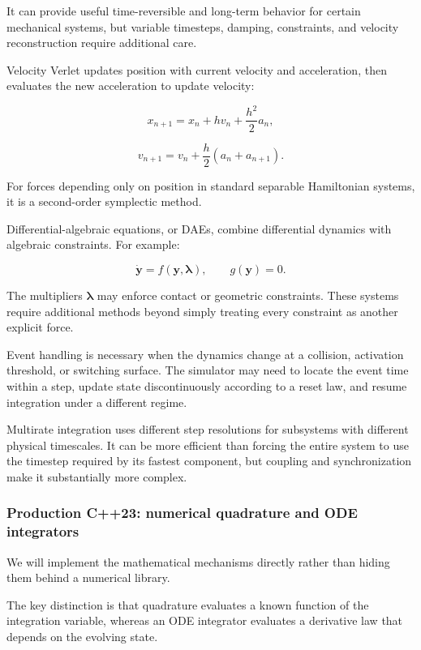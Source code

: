 It can provide useful time-reversible and long-term behavior for certain mechanical systems, but variable timesteps, damping, constraints, and velocity reconstruction require additional care.

Velocity Verlet updates position with current velocity and acceleration, then evaluates the new acceleration to update velocity:

\[
x_{n+1}=x_n+hv_n+\frac{h^2}{2}a_n,
\]

\[
v_{n+1}=v_n+\frac h2(a_n+a_{n+1}).
\]

For forces depending only on position in standard separable Hamiltonian systems, it is a second-order symplectic method.

Differential-algebraic equations, or DAEs, combine differential dynamics with algebraic constraints. For example:

\[
\dot{\mathbf y}=f(\mathbf y,\boldsymbol\lambda), \qquad g(\mathbf y)=0.
\]

The multipliers \(\boldsymbol\lambda\) may enforce contact or geometric constraints. These systems require additional methods beyond simply treating every constraint as another explicit force.

Event handling is necessary when the dynamics change at a collision, activation threshold, or switching surface. The simulator may need to locate the event time within a step, update state discontinuously according to a reset law, and resume integration under a different regime.

Multirate integration uses different step resolutions for subsystems with different physical timescales. It can be more efficient than forcing the entire system to use the timestep required by its fastest component, but coupling and synchronization make it substantially more complex.

\subsubsection{Production C++23: numerical quadrature and ODE integrators}\label{02-foundations-ii-ch025-production-c23-numerical-quadrature-and-ode-integrators}

We will implement the mathematical mechanisms directly rather than hiding them behind a numerical library.

The key distinction is that quadrature evaluates a known function of the integration variable, whereas an ODE integrator evaluates a derivative law that depends on the evolving state.

